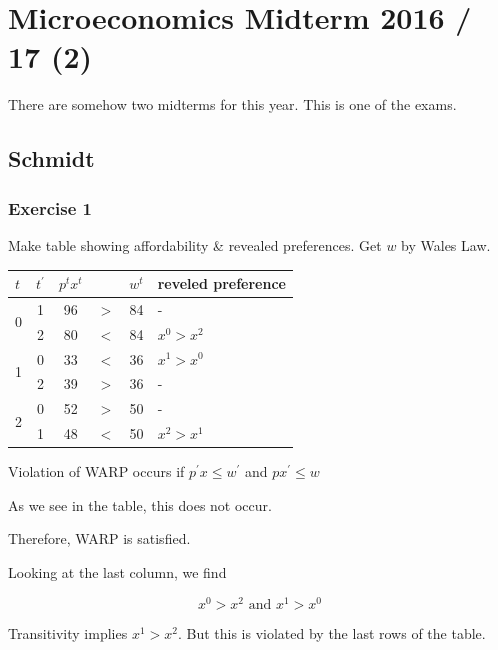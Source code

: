 \section*{Microeconomics Midterm 2016 / 17 (2)}

There are somehow two midterms for this year. This is one of the exams.

{
\subsection*{Schmidt}

\subsubsection*{Exercise 1}

Make table showing affordability \& revealed preferences. Get $w$ by Wales Law.

\begin{table}[!htp]
    \centering
    \begin{tabular}{l|c|c|c|c|l}
        $t$ & $t^{\prime}$ & $p^{t} x^{t}$ &  & $w^{t}$ & reveled preference \\
        \hline \multirow{2}{*}{0} & 1 & 96 & $>$ & 84 & - \\
        \cline { 2 - 6 } & 2 & 80 & $<$ & 84 & $x^{0}>x^{2}$ \\
        \hline \multirow{2}{*}{1} & 0 & 33 & $<$ & 36 & $x^{1}>x^{0}$ \\
        \cline { 2 - 6 } & 2 & 39 & $>$ & 36 & - \\
        \hline \multirow{2}{*}{2} & 0 & 52 & $>$ & 50 & - \\
        \cline { 2 - 6 } & 1 & 48 & $<$ & 50 & $x^{2}>x^{1}$ \\
        \hline
    \end{tabular}
\end{table}

\begin{enumerate}[label=(\alph*)]
{\item 
Violation of WARP occurs if $p^{\prime} x \leqslant w^{\prime}$ and $p x^{\prime} \leqslant w$

As we see in the table, this does not occur.

Therefore, WARP is satisfied.
}
{\item 
Looking at the last column, we find

$$
x^{0}>x^{2} \text { and } x^{1}>x^{0}
$$

Transitivity implies $x^{1}>x^{2}$. But this is violated by the last rows of the table.
}
\end{enumerate}
}
